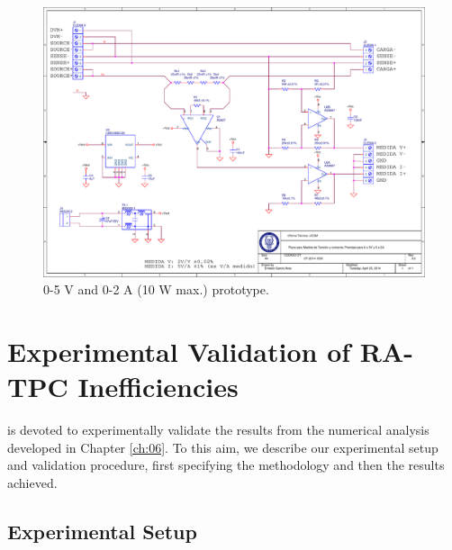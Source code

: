 \documentclass[twoside,nohyper]{tufte-book}
\newcommand{\restorewidth}{
  \restoregeometry
  \fancyhfoffset[RO]{{\marginparsep+\marginparwidth}}
}
\theoremstyle{definition}
\theoremstyle{definition}
\theoremstyle{definition}
\theoremstyle{remark}
\begin{document}
\begin{figure}

{\centering \includegraphics{img/03/schematic-v3} 

}

\caption[0-5 V and 0-2 A (10 W max.) prototype.]{0-5 V and 0-2 A (10 W max.) prototype.}\label{fig:schematicv3}
\end{figure}

\restorewidth

\hypertarget{experimental-validation-of-ra-tpc-inefficiencies}{%
\chapter{Experimental Validation of RA-TPC
Inefficiencies}\label{experimental-validation-of-ra-tpc-inefficiencies}}

 is devoted to experimentally validate the
results from the numerical analysis developed in Chapter \ref{ch:06}. To
this aim, we describe our experimental setup and validation procedure,
first specifying the methodology and then the results achieved.

\hypertarget{experimental-setup}{%
\section{Experimental Setup}\label{experimental-setup}}
\end{document}
